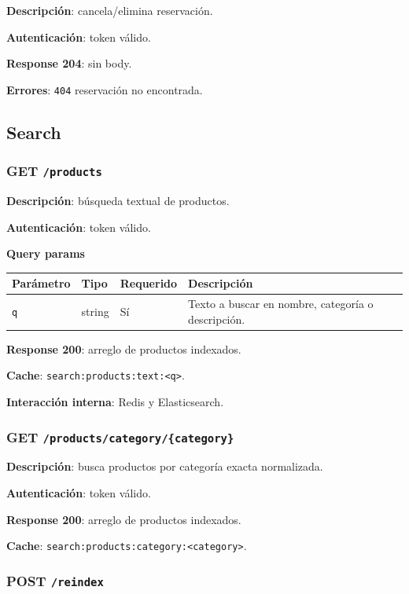 \documentclass[12pt,letterpaper]{article}
\def\codefile#1{\nolinkurl{#1}}
\def\methodget{\textbf{\color{blue!60!black}GET}}
\def\methodpost{\textbf{\color{green!45!black}POST}}
\begin{document}
\textbf{Descripción}: cancela/elimina reservación.

\textbf{Autenticación}: token válido.

\textbf{Response 204}: sin body.

\textbf{Errores}: \codefile{404} reservación no encontrada.

\subsection{Search}

\subsubsection{\methodget{} \codefile{/products}}

\textbf{Descripción}: búsqueda textual de productos.

\textbf{Autenticación}: token válido.

\textbf{Query params}
\begin{longtable}{p{}p{}p{}p{}}
\toprule
\textbf{Parámetro} & \textbf{Tipo} & \textbf{Requerido} & \textbf{Descripción}\\
\midrule
\codefile{q} & string & Sí & Texto a buscar en nombre, categoría o descripción.\\
\bottomrule
\end{longtable}

\textbf{Response 200}: arreglo de productos indexados.

\textbf{Cache}: \codefile{search:products:text:<q>}.

\textbf{Interacción interna}: Redis y Elasticsearch.

\subsubsection{\methodget{} \codefile{/products/category/{category}}}

\textbf{Descripción}: busca productos por categoría exacta normalizada.

\textbf{Autenticación}: token válido.

\textbf{Response 200}: arreglo de productos indexados.

\textbf{Cache}: \codefile{search:products:category:<category>}.

\subsubsection{\methodpost{} \codefile{/reindex}}
\end{document}
